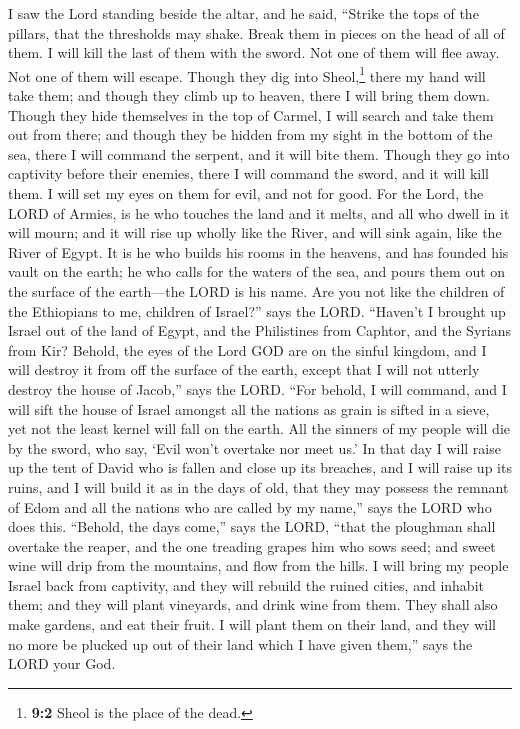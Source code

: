  I saw the Lord standing beside the altar, and he said,
``Strike the tops of the pillars, that the thresholds may shake. Break
them in pieces on the head of all of them. I will kill the last of them
with the sword. Not one of them will flee away. Not one of them will
escape.  Though they dig into Sheol,\footnote{\textbf{9:2}
  Sheol is the place of the dead.} there my hand will take them; and
though they climb up to heaven, there I will bring them down.
 Though they hide themselves in the top of Carmel, I will
search and take them out from there; and though they be hidden from my
sight in the bottom of the sea, there I will command the serpent, and it
will bite them.  Though they go into captivity before
their enemies, there I will command the sword, and it will kill them. I
will set my eyes on them for evil, and not for good.  For
the Lord, the LORD of Armies, is he who touches the land and it melts,
and all who dwell in it will mourn; and it will rise up wholly like the
River, and will sink again, like the River of Egypt.  It
is he who builds his rooms in the heavens, and has founded his vault on
the earth; he who calls for the waters of the sea, and pours them out on
the surface of the earth---the LORD is his name.  Are you
not like the children of the Ethiopians to me, children of Israel?''
says the LORD. ``Haven't I brought up Israel out of the land of Egypt,
and the Philistines from Caphtor, and the Syrians from Kir?
 Behold, the eyes of the Lord GOD are on the sinful
kingdom, and I will destroy it from off the surface of the earth, except
that I will not utterly destroy the house of Jacob,'' says the LORD.
 ``For behold, I will command, and I will sift the house
of Israel amongst all the nations as grain is sifted in a sieve, yet not
the least kernel will fall on the earth.  All the sinners
of my people will die by the sword, who say, `Evil won't overtake nor
meet us.'  In that day I will raise up the tent of David
who is fallen and close up its breaches, and I will raise up its ruins,
and I will build it as in the days of old,  that they may
possess the remnant of Edom and all the nations who are called by my
name,'' says the LORD who does this.  ``Behold, the days
come,'' says the LORD, ``that the ploughman shall overtake the reaper,
and the one treading grapes him who sows seed; and sweet wine will drip
from the mountains, and flow from the hills.  I will
bring my people Israel back from captivity, and they will rebuild the
ruined cities, and inhabit them; and they will plant vineyards, and
drink wine from them. They shall also make gardens, and eat their fruit.
 I will plant them on their land, and they will no more
be plucked up out of their land which I have given them,'' says the LORD
your God.
